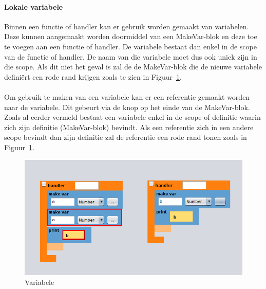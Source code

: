 \documentclass[]{article}
\begin{document}
\paragraph{Lokale variabele}
Binnen een functie of handler kan er gebruik worden gemaakt van variabelen. Deze kunnen aangemaakt worden doormiddel van een MakeVar-blok en deze toe te voegen aan een functie of handler. De variabele bestaat dan enkel in de scope van de functie of handler. De naam van die variabele moet dus ook uniek zijn in die scope. Als dit niet het geval is zal de de MakeVar-blok die de nieuwe variabele defini\"{e}rt een rode rand krijgen zoals te zien in Figuur~\ref{Variabele}.\\\\
Om gebruik te maken van een variabele kan er een referentie gemaakt worden naar de variabele. Dit gebeurt via de knop op het einde van de MakeVar-blok. Zoals al eerder vermeld bestaat een variabele enkel in de scope of definitie waarin zich zijn definitie (MakeVar-blok) bevindt. Als een referentie zich in een andere scope bevindt dan zijn definitie zal de referentie een rode rand tonen zoals in Figuur~\ref{Variabele}.

\begin{figure}[H]
  \centering
\includegraphics[scale=0.5]{Documentatie/images/errorvars}
  \caption{Variabele} 
  \label{Variabele}
\end{figure}
\end{document}
